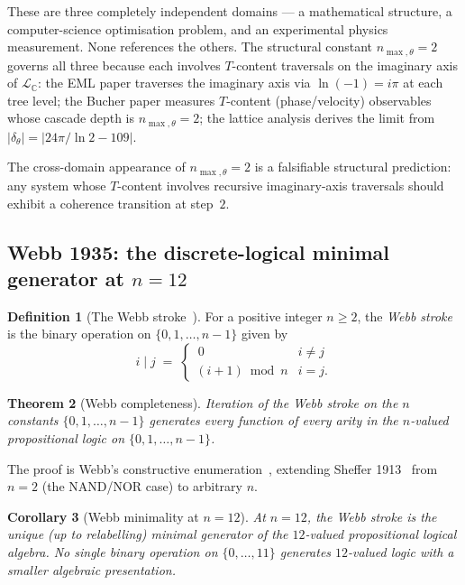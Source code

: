 \documentclass[11pt,a4paper]{article}
\newtheorem{theorem}{Theorem}[section]
\newtheorem{corollary}[theorem]{Corollary}
\theoremstyle{definition}
\newtheorem{definition}[theorem]{Definition}
\theoremstyle{remark}
\newcommand{\C}{\mathbb{C}}
\begin{document}
These are three completely independent domains --- a mathematical structure, a computer-science optimisation problem, and an experimental physics measurement. None references the others. The structural constant $n_{\max,\theta}=2$ governs all three because each involves $T$-content traversals on the imaginary axis of $\mathcal{L}_{\C}$: the EML paper traverses the imaginary axis via $\ln(-1) = i\pi$ at each tree level; the Bucher paper measures $T$-content (phase/velocity) observables whose cascade depth is $n_{\max,\theta}=2$; the lattice analysis derives the limit from $|\delta_{\theta}| = |24\pi/\ln 2 - 109|$.

The cross-domain appearance of $n_{\max,\theta}=2$ is a falsifiable structural prediction: any system whose $T$-content involves recursive imaginary-axis traversals should exhibit a coherence transition at step~$2$.

\subsection{Webb 1935: the discrete-logical minimal generator at $n=12$}\label{subsec:webb}

\begin{definition}[The Webb stroke~\cite{Webb1935}]\label{def:webb}
For a positive integer $n\ge 2$, the \emph{Webb stroke} is the binary operation on $\{0,1,\ldots,n-1\}$ given by
\[
i \mathbin{|} j \;=\; \begin{cases}\, 0 & i \neq j \\ (i+1) \bmod n & i = j.\end{cases}
\]
\end{definition}

\begin{theorem}[Webb completeness]\label{thm:webb-complete}
Iteration of the Webb stroke on the $n$ constants $\{0,1,\ldots,n-1\}$ generates every function of every arity in the $n$-valued propositional logic on $\{0,1,\ldots,n-1\}$.
\end{theorem}

The proof is Webb's constructive enumeration~\cite{Webb1935}, extending Sheffer 1913~\cite{Sheffer1913} from $n=2$ (the NAND/NOR case) to arbitrary $n$.

\begin{corollary}[Webb minimality at $n=12$]\label{cor:webb-minimal}
At $n=12$, the Webb stroke is the unique (up to relabelling) minimal generator of the $12$-valued propositional logical algebra. No single binary operation on $\{0,\ldots,11\}$ generates $12$-valued logic with a smaller algebraic presentation.
\end{corollary}
\end{document}
